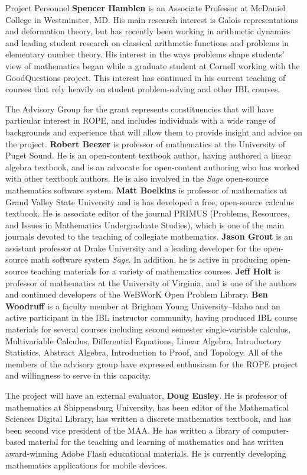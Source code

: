 \documentclass[11pt]{article}
\begin{document}
\begin{section}{Project Personnel}
\textbf{Spencer Hamblen} is an Associate Professor at McDaniel College in
Westminster, MD.  His main research interest is Galois representations and
deformation theory, but has recently been working in arithmetic dynamics
and leading student research on classical arithmetic functions and problems 
in elementary number theory.  His interest in the ways problems shape 
students' view of mathematics began while a graduate student at Cornell 
working with the GoodQuestions project.  This interest has continued in his 
current teaching of courses that rely heavily on student problem-solving 
and other IBL courses.

The Advisory Group for the grant represents constituencies that will have
particular interest in ROPE, and includes individuals with a wide range of
backgrounds and experience that will allow them to provide insight and
advice on the project.  \textbf{Robert Beezer} is professor of mathematics
at the University of Puget Sound.  He is an open-content textbook author,
having authored a linear algebra textbook, and is an advocate for
open-content authoring who has worked with other textbook authors.  He is
also involved in the \emph{Sage} open-source mathematics software system.
\textbf{Matt Boelkins} is professor of mathematics at Grand Valley State
University and is has developed a free, open-source calculus textbook.  He is
associate editor of the journal PRIMUS (Problems, Resources, and Issues
in Mathematics Undergraduate Studies), which is one of the main journals
devoted to the teaching of collegiate mathematics.  
\textbf{Jason Grout} is an assistant professor at Drake University and a leading developer for the open-source math software system \emph{Sage}.  In addition, he is active in producing open-source teaching materials for a variety of mathematics courses.
\textbf{Jeff Holt} is professor of mathematics at the University of
Virginia, and is one of the authors and continued developers of the
WeBWorK Open Problem Library.
\textbf{Ben Woodruff} is a faculty member at Brigham Young
University--Idaho and an active participant in the IBL instructor
community, having produced IBL course materials for several courses including second semester single-variable calculus, Multivariable Calculus, Differential Equations, Linear Algebra, Introductory Statistics, Abstract Algebra, Introduction to Proof, and Topology.
All of the members of the advisory group have expressed enthusiasm for the
ROPE project and willingness to serve in this capacity.  

The project will have an external evaluator, \textbf{Doug Ensley}.
He is professor of mathematics at Shippensburg
University, has been editor of the Mathematical Sciences Digital Library,
has written a discrete mathematics textbook, and has been second vice
president of the MAA.  He has written a library of computer-based material
for the teaching and learning of mathematics and has written award-winning
Adobe Flash educational materials.  He is currently developing
mathematics applications for mobile devices.


\end{section}
\end{document}
